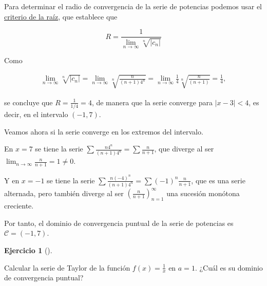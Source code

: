 \documentclass[
  spanish,
  a4paper,
]{scrreport}
\theoremstyle{definition}
\newtheorem{exercise}{Ejercicio}[chapter]
\theoremstyle{remark}
\begin{document}
\begin{tcolorbox}[enhanced jigsaw, arc=.35mm, bottomrule=.15mm, bottomtitle=1mm, breakable, colback=white, colbacktitle=quarto-callout-tip-color!10!white, colframe=quarto-callout-tip-color-frame, coltitle=black, left=2mm, leftrule=.75mm, opacityback=0, opacitybacktitle=0.6, rightrule=.15mm, title=\textcolor{quarto-callout-tip-color}{\faLightbulb}\hspace{0.5em}{Solución}, titlerule=0mm, toprule=.15mm, toptitle=1mm]

Para determinar el radio de convergencia de la serie de potencias
podemos usar el
\href{https://aprendeconalf.es/analisis-manual/08-series.html\#thm-radio-convergencia-raiz}{criterio
de la raíz}, que establece que

\[
R = \frac{1}{\lim_{n\to\infty} \sqrt[n]{|c_n|}}
\]

Como

\begin{align*}
\lim_{n\to\infty} \sqrt[n]{|c_n|} = \lim_{n\to\infty} \sqrt[n]{\frac{n}{(n+1)4^n}} = \lim_{n\to\infty} \frac{1}{4} \sqrt[n]{\frac{n}{(n+1)}} = \frac{1}{4},
\end{align*}

se concluye que \(R = \frac{1}{1/4} = 4\), de manera que la serie
converge para \(|x-3|<4\), es decir, en el intervalo \((-1,7)\).

Veamos ahora si la serie converge en los extremos del intervalo.

En \(x=7\) se tiene la serie
\(\sum \frac{n4^n}{(n+1)4^n} = \sum \frac{n}{n+1}\), que diverge al ser
\(\lim_{n\to\infty} \frac{n}{n+1} = 1 \neq 0\).

Y en \(x=-1\) se tiene la serie
\(\sum \frac{n(-4)^n}{(n+1)4^n} = \sum (-1)^n\frac{n}{n+1}\), que es una
serie alternada, pero también diverge al ser
\(\left(\frac{n}{n+1}\right)_{n=1}^\infty\) una sucesión monótona
creciente.

Por tanto, el dominio de convergencia puntual de la serie de potencias
es \(\mathcal{C}=(-1,7)\).

\end{tcolorbox}

\begin{exercise}[]\protect\hypertarget{exr-4}{}\label{exr-4}

Calcular la serie de Taylor de la función \(f(x)=\frac{1}{x}\) en
\(a=1\). ¿Cuál es su dominio de convergencia puntual?

\end{exercise}
\end{document}
